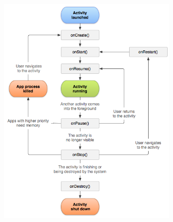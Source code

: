 \begin{figure}[H]
\centering
\includegraphics[width=0.8\textwidth]{Figures/activity_lifecycle.png}
\label{android-activity}
\end{figure}


